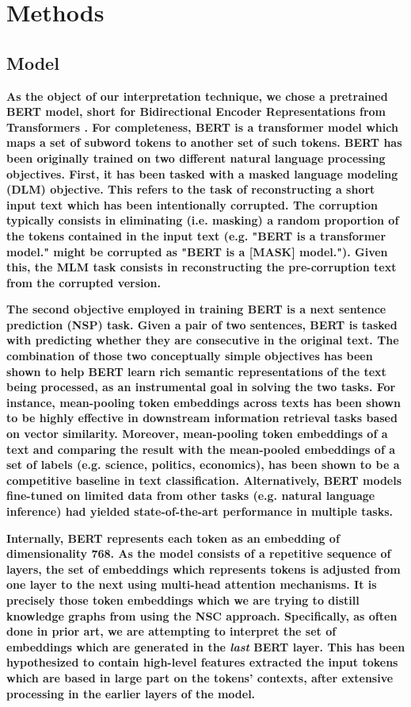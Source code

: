\section{Methods}\label{sec:methods}

\subsection{Model}

\textbf{As the object of our interpretation technique, we chose a pretrained BERT model, short for Bidirectional Encoder Representations from Transformers \citep{devlin_bert_nodate}. For completeness, BERT is a transformer model which maps a set of subword tokens to another set of such tokens. BERT has been originally trained on two different natural language processing objectives. First, it has been tasked with a masked language modeling (DLM) objective. This refers to the task of reconstructing a short input text which has been intentionally corrupted. The corruption typically consists in eliminating (i.e. masking) a random proportion of the tokens contained in the input text (e.g. "BERT is a transformer model." might be corrupted as "BERT is a [MASK] model."). Given this, the MLM task consists in reconstructing the pre-corruption text from the corrupted version.}

\textbf{The second objective employed in training BERT is a next sentence prediction (NSP) task. Given a pair of two sentences, BERT is tasked with predicting whether they are consecutive in the original text. The combination of those two conceptually simple objectives has been shown to help BERT learn rich semantic representations of the text being processed, as an instrumental goal in solving the two tasks. For instance, mean-pooling token embeddings across texts has been shown to be highly effective in downstream information retrieval tasks based on vector similarity. Moreover, mean-pooling token embeddings of a text and comparing the result with the mean-pooled embeddings of a set of labels (e.g. science, politics, economics), has been shown to be a competitive baseline in text classification. Alternatively, BERT models fine-tuned on limited data from other tasks (e.g. natural language inference) had yielded state-of-the-art performance in multiple tasks.}

\textbf{Internally, BERT represents each token as an embedding of dimensionality 768. As the model consists of a repetitive sequence of layers, the set of embeddings which represents tokens is adjusted from one layer to the next using multi-head attention mechanisms. It is precisely those token embeddings which we are trying to distill knowledge graphs from using the NSC approach. Specifically, as often done in prior art, we are attempting to interpret the set of embeddings which are generated in the \textit{last} BERT layer. This has been hypothesized to contain high-level features extracted the input tokens which are based in large part on the tokens' contexts, after extensive processing in the earlier layers of the model.}

